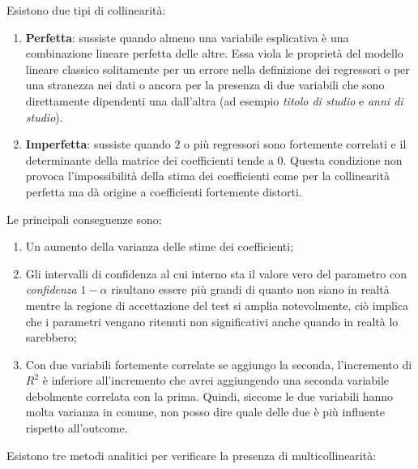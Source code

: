\documentclass[a4page, 11pt]{article} %
\begin{document}
Esistono due tipi di collinearità:
\begin{enumerate}[noitemsep]
\item \textbf{Perfetta}: sussiste quando almeno una variabile esplicativa è una combinazione lineare perfetta delle altre. Essa viola le proprietà del modello lineare classico solitamente per un errore nella definizione dei regressori o per una stranezza nei dati o ancora per la presenza di due variabili che sono direttamente dipendenti una dall'altra (ad esempio \textit{titolo di studio} e \textit{anni di studio}).
\item \textbf{Imperfetta}: sussiste quando $2$ o più regressori sono fortemente correlati e il determinante della matrice dei coefficienti tende a $0$. Questa condizione non provoca l'impossibilità della stima dei coefficienti come per la collinearità perfetta ma dà origine a coefficienti fortemente distorti.
\end{enumerate}
Le principali conseguenze sono:
\begin{enumerate}[noitemsep]
\item Un aumento della varianza delle stime dei coefficienti;
\item Gli intervalli di confidenza al cui interno sta il valore vero del parametro con \textit{confidenza} $1-\alpha$ risultano essere più grandi di quanto non siano in realtà mentre la regione di accettazione del test si amplia notevolmente, ciò implica che i parametri vengano ritenuti non significativi anche quando in realtà lo sarebbero;
\item Con due variabili fortemente correlate se aggiungo la seconda, l’incremento di $R^{2}$ è inferiore all’incremento che avrei aggiungendo una seconda variabile debolmente correlata con la prima. Quindi, siccome le due variabili hanno molta varianza in comune, non posso dire quale delle due è più influente rispetto all’outcome.
\end{enumerate}
Esistono tre metodi analitici per verificare la presenza di multicollinearità:
\end{document}
